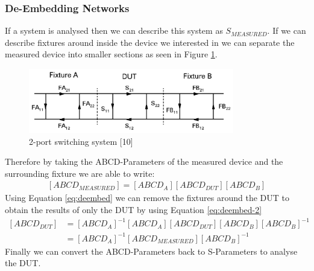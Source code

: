 \documentclass[12pt,openany,a4paper]{book}
\begin{document}
\subsubsection{De-Embedding Networks}
If a system is analysed then we can describe this system as $S_{MEASURED}$. If we can describe fixtures around inside the device we interested in we can separate the measured device into smaller sections as seen in Figure \ref{fig:deembedding}.
\begin{figure}[H]
	\centering
    \includegraphics[width=0.8\textwidth]{de-embedded.png}
	\caption{2-port switching system [10]}
	\label{fig:deembedding}
\end{figure} 
Therefore by taking the ABCD-Parameters of the measured device and the surrounding fixture we are able to write:
\begin{align}
\left[ ABCD_{MEASURED} \right] = \left[ ABCD_{A} \right] \left[ ABCD_{DUT} \right] \left[ ABCD_{B} \right] \label{eq:deembed}
\end{align}
Using Equation \ref{eq:deembed} we can remove the fixtures around the DUT to obtain the results of only the DUT by using Equation \ref{eq:deembed-2}
\begin{align}
\left[ ABCD_{DUT} \right] &= \left[ ABCD_{A} \right]^{-1}
\left[ ABCD_{A} \right]
\left[ ABCD_{DUT} \right]
\left[ ABCD_{B} \right]
\left[ ABCD_{B} \right]^{-1}\\
&= \left[ ABCD_{A} \right]^{-1}
\left[ ABCD_{MEASURED} \right]
\left[ ABCD_{B} \right]^{-1} \label{eq:deembed-2}
\end{align}
Finally we can convert the ABCD-Parameters back to S-Parameters to analyse the DUT. \cite{}
\end{document}

